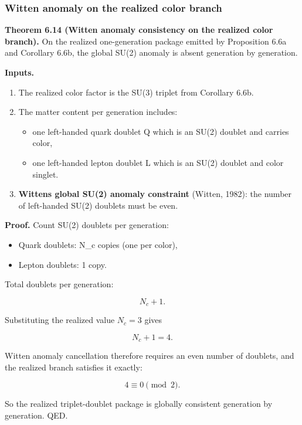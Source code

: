 \subsubsection{Witten anomaly on the realized color branch}\label{69-witten-anomaly-and-the-number-of-colors}

\textbf{Theorem 6.14 (Witten anomaly consistency on the realized color branch).} On the realized one-generation package emitted by Proposition 6.6a and Corollary 6.6b, the global SU(2) anomaly is absent generation by generation.

\textbf{Inputs.}

\begin{enumerate}
\def\labelenumi{\arabic{enumi}.}
\tightlist
\item
  The realized color factor is the SU(3) triplet from Corollary 6.6b.
\item
  The matter content per generation includes:

  \begin{itemize}
  \tightlist
  \item
    one left-handed quark doublet Q which is an SU(2) doublet and carries color,
  \item
    one left-handed lepton doublet L which is an SU(2) doublet and color singlet.
  \end{itemize}
\item
  \textbf{Witten\textquotesingle s global SU(2) anomaly constraint} (Witten, 1982): the number of left-handed SU(2) doublets must be even.
\end{enumerate}

\textbf{Proof.} Count SU(2) doublets per generation:

\begin{itemize}
\tightlist
\item
  Quark doublets: N\_c copies (one per color),
\item
  Lepton doublets: 1 copy.
\end{itemize}

Total doublets per generation:

\[
N_c + 1.
\]

Substituting the realized value \(N_c=3\) gives

\[
N_c+1=4.
\]

Witten anomaly cancellation therefore requires an even number of doublets, and the realized branch satisfies it exactly:

\[
4 \equiv 0 \pmod{2}.
\]

So the realized triplet-doublet package is globally consistent generation by generation. QED.

